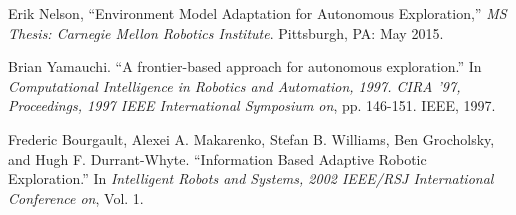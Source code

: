 \documentclass[12pt]{article}
\begin{document}
\begin{thebibliography}{99}

 Erik Nelson, ``Environment Model Adaptation for Autonomous Exploration,'' \textit{MS Thesis: Carnegie Mellon Robotics Institute}. Pittsburgh, PA: May 2015.

 Brian Yamauchi. ``A frontier-based approach for autonomous exploration.'' In \textit{Computational Intelligence in Robotics and Automation, 1997. CIRA '97, Proceedings, 1997 IEEE International Symposium on}, pp. 146-151. IEEE, 1997.

 Frederic Bourgault, Alexei A. Makarenko, Stefan B. Williams, Ben Grocholsky, and Hugh F. Durrant-Whyte. ``Information Based Adaptive Robotic Exploration.'' In \textit{Intelligent Robots and Systems, 2002 IEEE/RSJ International Conference on}, Vol. 1.
  
\end{thebibliography}
\end{document}
